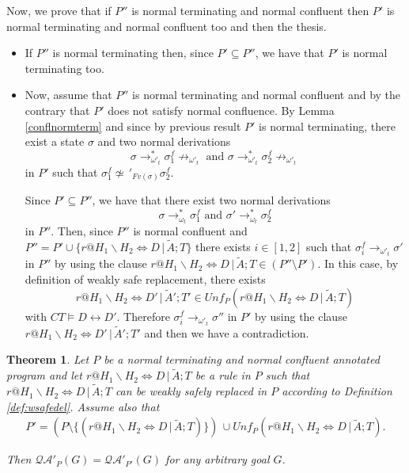 \documentclass[final]{acmtrans2e}
\newtheorem{theorem}{Theorem}[section]
\newcommand{\rrarrow}{\longrightarrow}
\begin{document}
 \noindent Now, we prove that if $P''$ is normal terminating and normal confluent then $P'$ is normal terminating and normal confluent too and then the thesis.
 \begin{itemize}
   \item If $P''$ is normal terminating then, since $P'\subseteq P''$, we have that
  $P'$ is normal terminating too.
   \item Now, assume that $P''$ is normal terminating and normal confluent and  by the contrary that $P'$ does not satisfy normal confluence. By Lemma \ref{conflnormterm} and since by previous result $P'$ is normal terminating, there exist a state
$\sigma$ and two normal derivations
\[\sigma\rrarrow_{\omega'_t}^{*}\sigma_1^f\not \rrarrow_{\omega'_t} \mbox{ and } \sigma\rrarrow_{\omega'_t}^{*}\sigma_2^f\not \rrarrow_{\omega'_t}
\]
 in $P'$ such that
$\sigma_1^f \not \simeq\,'_{Fv(\sigma)}\sigma_2^f$.


Since $P' \subseteq P''$, we have that there exist two normal derivations
\[\sigma\rrarrow_{\omega_t}^{*}\sigma_1^f \mbox{ and } \sigma'\rrarrow_{\omega_t}^{*}\sigma_2^f\]
in $P''$. Then, since $P''$ is normal confluent and $P''= P '\cup \{r@H_1\backslash H_2 \Leftrightarrow D\,|\,\tilde A; T\}$ there exists $i \in [1,2]$ such that
$\sigma_i^f\rrarrow_{\omega'_t}\sigma'$ in $P''$ by using the clause $r@H_1\backslash H_2 \Leftrightarrow D\,|\,\tilde A; T \in (P'' \setminus P')$. In this case, by definition of weakly safe replacement, there exists
$$r@ H_1\backslash H_2 \Leftrightarrow D'\, |\, \tilde A'; T' \in
   Unf_P (r@H_1\backslash H_2 \Leftrightarrow D\,|\,\tilde A; T)$$
with $CT \models D \leftrightarrow D'$. Therefore $\sigma_i^f\rrarrow_{\omega'_t}\sigma''$ in $P'$ by using the clause $r@ H_1\backslash H_2 \Leftrightarrow D'\, |\, \tilde A'; T'$ and then we have a contradiction.
 \end{itemize}

\noindent{$\Box$}

\begin{theorem}\label{prop:wqualified}
Let $P$ be a normal terminating and normal confluent annotated program and let $r@H_1\backslash H_2
\Leftrightarrow D\,|\,\tilde A; T$ be a rule in $P$ such that
$r@H_1\backslash H_2 \Leftrightarrow  D\,|\,\tilde A; T $ can be weakly safely replaced
in $P$ according to Definition \ref{def:wsafedel}. Assume also that
\[\begin{array}{l}
  P'  =  (P\setminus   \{(r@H_1\backslash H_2 \Leftrightarrow D\,|\,\tilde A; T)\} ) \, \cup
   Unf_{P}(r@H_1\backslash H_2 \Leftrightarrow D\,|\,\tilde A; T).
\end{array}
\]

Then $\mathcal{QA'}_{P}(G)=\mathcal{QA'}_{P'}(G)$ for any arbitrary
goal $G$.
\end{theorem}
\end{document}
